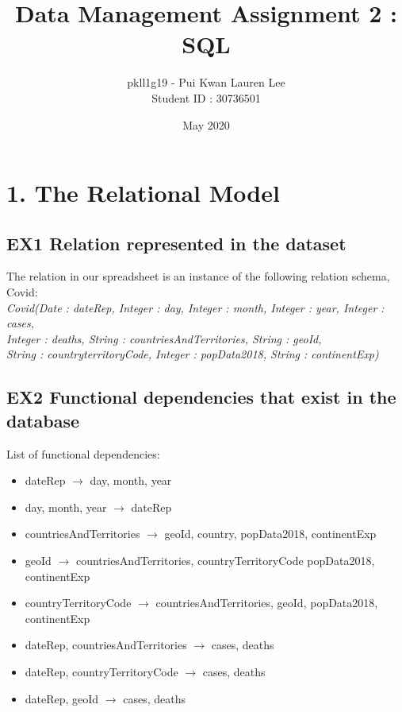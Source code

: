 \documentclass{report}
\title{Data Management Assignment 2 : SQL}
\author{pkll1g19 - Pui Kwan Lauren Lee \\ Student ID : 30736501}
\date{May 2020}
\begin{document}
\maketitle 

\section*{1. The Relational Model}
\subsection*{EX1 Relation represented in the dataset }

The relation in our spreadsheet is an instance of the following relation schema, Covid: \\
\textit{Covid(Date : dateRep, Integer : day, Integer : month, Integer : year, Integer : cases, \\ \indent\indent\indent Integer : deaths, String : countriesAndTerritories, String : geoId, \\ \indent\indent\indent String : countryterritoryCode, Integer : popData2018, String : continentExp)}

\vspace{0.2cm}

\subsection*{EX2 Functional dependencies that exist in the database}
List of functional dependencies:
\begin{itemize}
    \item dateRep $\rightarrow$ day, month, year
    \item day, month, year $\rightarrow$ dateRep
    \item countriesAndTerritories $\rightarrow$ geoId, country, popData2018, continentExp
    \item geoId $\rightarrow$ countriesAndTerritories, countryTerritoryCode popData2018, continentExp
    \item countryTerritoryCode $\rightarrow$ countriesAndTerritories, geoId, popData2018, continentExp
    \item dateRep, countriesAndTerritories $\rightarrow$ cases, deaths
    \item dateRep, countryTerritoryCode $\rightarrow$ cases, deaths
    \item dateRep, geoId $\rightarrow$ cases, deaths
\end{itemize}
\end{document}
